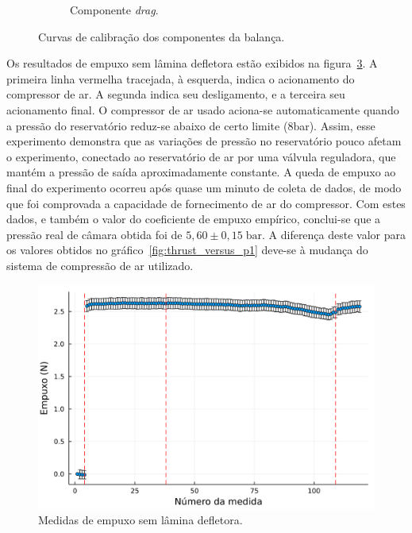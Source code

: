 \begin{figure}[htbp]
\begin{subfigure}{\textwidth}
        \caption{Componente \textit{drag}.}\label{fig:calibration_FD}
    \end{subfigure}
    \caption{Curvas de calibração dos componentes da balança.}\label{fig:calibration_curves}
\end{figure}

Os resultados de empuxo sem lâmina defletora estão exibidos na figura~\ref{fig:thrust_no_deflector}. A primeira linha vermelha tracejada, à esquerda, indica o acionamento do compressor de ar. A segunda indica seu desligamento, e a terceira seu acionamento final. O compressor de ar usado aciona-se automaticamente quando a pressão do reservatório reduz-se abaixo de certo limite (8bar). Assim, esse experimento demonstra que as variações de pressão no reservatório pouco afetam o experimento, conectado ao reservatório de ar por uma válvula reguladora, que mantém a pressão de saída aproximadamente constante. A queda de empuxo ao final do experimento ocorreu após quase um minuto de coleta de dados, de modo que foi comprovada a capacidade de fornecimento de ar do compressor. Com estes dados, e também o valor do coeficiente de empuxo empírico, conclui-se que a pressão real de câmara obtida foi de \(5,60\pm 0,15\;\mathrm{bar}\). A diferença deste valor para os valores obtidos no gráfico~\ref{fig:thrust_versus_p1} deve-se à mudança do sistema de compressão de ar utilizado.

\begin{figure}[htbp]
    \centering
    \includegraphics[width=\textwidth]{img/results/thrust_no_deflector.png}
    \caption{Medidas de empuxo sem lâmina defletora.}\label{fig:thrust_no_deflector}
\end{figure}

